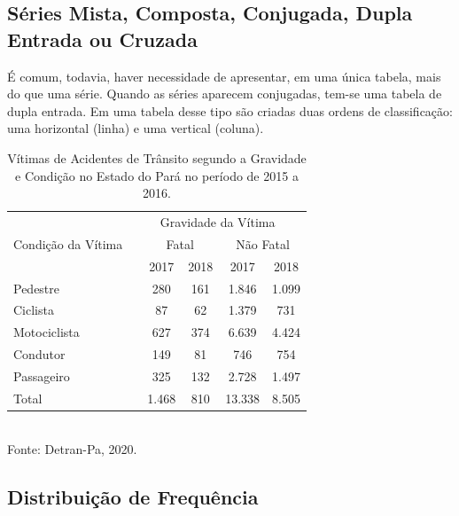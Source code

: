\subsection{Séries Mista, Composta, Conjugada, Dupla Entrada ou Cruzada}


\inic É comum, todavia, haver necessidade de apresentar, em uma única tabela, mais do que uma série. Quando as séries aparecem conjugadas, tem-se uma tabela de dupla entrada. Em uma tabela desse tipo são criadas duas ordens de classificação: uma horizontal (linha) e uma vertical (coluna).


\begin{table}[!htb]
\footnotesize
    \centering
    {
    \caption{Vítimas de Acidentes de Trânsito segundo a Gravidade e Condição no Estado do Pará no período de 2015 a 2016.}
    \label{obitos2}
    \vspace{0.2cm}
\begin{tabular}{l|c|c|c|c|c}
  \hline\hline
                  &  \multicolumn{5}{c}{Gravidade da Vítima} \\
  \cline{3-6}
  Condição da Vítima &      & \multicolumn{2}{c}{Fatal }& \multicolumn{2}{c}{Não Fatal}  \\
  \cline{3-6}
                     &      & 2017                      & 2018  & 2017     & 2018 \\
  \hline
  Pedestre           &      & 280                       & 161   & 1.846    & 1.099  \\
  Ciclista           &      & 87                        & 62    & 1.379    & 731    \\
  Motociclista       &      & 627                       & 374   & 6.639    & 4.424  \\
  Condutor           &      & 149                       & 81    & 746      & 754    \\
  Passageiro         &      & 325                       & 132   & 2.728    & 1.497  \\
  \hline\hline
  Total              &      & 1.468                     & 810   & 13.338   & 8.505  \\
   \hline\hline
\end{tabular}}
\\
\hspace{-5.5cm} Fonte: Detran-Pa, 2020.
\end{table}


\subsection{Distribuição de Frequência}

